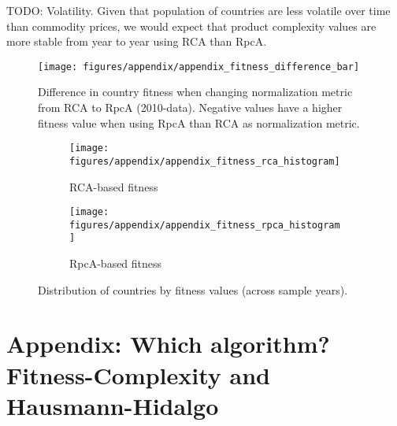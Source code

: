 \documentclass[11pt]{article}
\begin{document}
\begin{appendices}
TODO: Volatility. Given that population of countries are less volatile over time than commodity prices, we would expect that product complexity values are more stable from year to year using RCA than RpcA.
\begin{figure}[ht]
  \centering
  \texttt{[image: figures/appendix/appendix\_fitness\_difference\_bar]}
  \caption{Difference in country fitness when changing normalization metric from RCA to RpcA (2010-data). Negative values have a higher fitness value when using RpcA than RCA as normalization metric.}
  \label{fig:bar_plot_diff}
\end{figure}

\begin{figure}
     \centering
     \begin{subfigure}[b]{0.45\textwidth}
         \centering
         \texttt{[image: figures/appendix/appendix\_fitness\_rca\_histogram]}
         \caption{RCA-based fitness}
         \label{fig:rca_fit_hist}
     \end{subfigure}
     \hfill
     \begin{subfigure}[b]{0.45\textwidth}
         \centering
         \texttt{[image: figures/appendix/appendix\_fitness\_rpca\_histogram]}
         \caption{RpcA-based fitness}
         \label{fig:rpca_fit_hist}
     \end{subfigure}
        \caption{Distribution of countries by fitness values (across sample years).}
        \label{fig:rca_rpca_fit_hist}
\end{figure}



\newpage

\section{Appendix: Which algorithm? Fitness-Complexity and Hausmann-Hidalgo}
\label{sec:appendix-algorithm}


\end{appendices}
\end{document}
